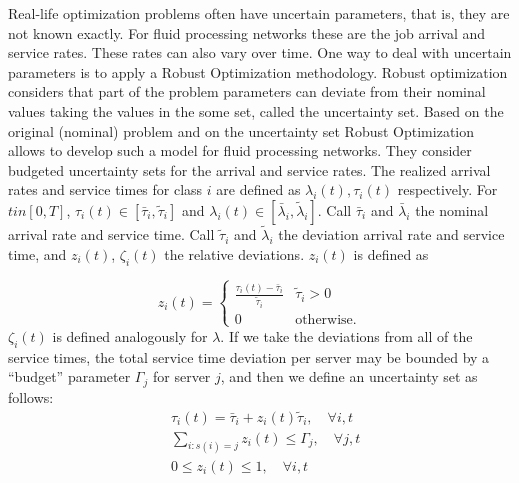 \documentclass[11pt,a4paper,titlepage]{article}
\theoremstyle{definition}
\theoremstyle{plain}
\begin{document}
    Real-life optimization problems often have uncertain parameters,
    that is, they are not known exactly.
    For fluid processing networks these are the job arrival and service rates.
    These rates can also vary over time.
    One way to deal with uncertain parameters is to apply a Robust Optimization methodology.
    Robust optimization considers that part of the problem parameters can deviate from their nominal values taking the values in the some set,
    called the uncertainty set.
    Based on the original (nominal) problem and on the uncertainty set Robust Optimization allows
    \Autocite{bertsimas2014robust} to develop such a model for
    fluid processing networks.
    They consider budgeted uncertainty sets for the arrival and service rates.
    The realized arrival rates and service times for class $i$ are
    defined as $\lambda_i(t), \tau_i(t)$ respectively.
    For $t in [0,T]$,
    $\tau_i(t) \in [\bar{\tau}_i, \tilde{\tau}_i]$ and
    $\lambda_i(t) \in [\bar{\lambda}_i, \tilde{\lambda}_i]$.
    Call $\bar{\tau}_i$ and $\bar{\lambda}_i$ the nominal arrival rate and service time.
    Call $\tilde{\tau}_i$ and $\tilde{\lambda}_i$ the deviation arrival rate and service time,
    and $z_i(t)$, $\zeta_i(t)$ the relative deviations.
    $z_i(t)$ is defined as

    \begin{equation}
        z_i(t) =
        \begin{cases}
            \frac{\tau_i(t) - \bar{\tau}_i}{\tilde{\tau}_i} & \tilde{\tau}_i > 0 \\
            0 & \text{otherwise.}
        \end{cases}
    \end{equation}
    $\zeta_i(t)$ is defined analogously for $\lambda$.
    If we take the deviations from all of the service times,
    the total service time deviation per server may be bounded by a ``budget''
    parameter $\Gamma_j$ for server $j$,
    and then we define an uncertainty set as follows:
    \begin{equation}
        \begin{split}
            &\tau_{i}(t)=\bar{\tau}_{i}+z_{i}(t) \tilde{\tau}_{i}, \quad \forall i, t \\
            &\sum_{i: s(i)=j} z_{i}(t) \leq \Gamma_{j}, \quad \forall j, t \\
            &0 \leq z_{i}(t) \leq 1, \quad \forall i, t
        \end{split}
    \end{equation}
\end{document}

